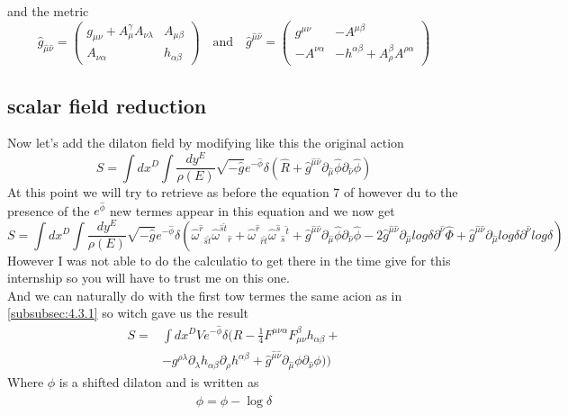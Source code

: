\documentclass{article}
\begin{document}
and the metric 
\begin{equation}
    \hat g_{\hat \mu \hat \nu} = \begin{pmatrix}
        g_{\mu \nu} + A^{\gamma}_{\mu}A_{\nu \lambda} &  A_{\mu \beta} \\  A_{\nu \alpha} &h_{\alpha \beta}
    \end{pmatrix} \quad \text{and} \quad \hat g^{\hat \mu \hat \nu} = \begin{pmatrix}
        g^{\mu \nu}  & - A^{\mu \beta} \\ - A^{\nu \alpha} &-h^{\alpha \beta}+ A^{\beta}_{\rho}A^{\rho \alpha}
    \end{pmatrix}
\end{equation}
\subsection{scalar field reduction}
Now let's add the dilaton field by modifying like this the original action
\begin{equation} 
    S =\int d x^D \int \frac{d y ^E}{\rho(E)} \sqrt{- \hat g} e^{- \hat \phi}\delta(\hat R  + \hat g^{\hat \mu  \hat \nu } \partial_{\hat \mu}\hat\phi\partial_{\hat \nu}\hat\phi)
\end{equation}
At this point we will try to retrieve as before the equation 7 of \cite{scherk1979get} however du to the presence of the $e^{\hat \phi}$ new termes appear in this equation and we now get
\begin{equation}
    S =\int d x^D \int \frac{d y ^E}{\rho(E)} \sqrt{- \hat g} e^{- \hat \phi}\delta( \hat \omega^{\hat r}{}_{\hat s \hat t} \hat \omega^{\hat s \hat t}{}_{\hat r} + \hat \omega^{\hat r}{}_{ \hat r \hat t}\hat \omega^{\hat s }{}_{\hat s}{}^{\hat t}+\hat g^{\hat \mu  \hat \nu } \partial_{\hat \mu}\hat\phi\partial_{\hat \nu}\hat\phi - 2 \hat g^{\hat \mu \hat \nu} \partial_{\hat \mu}log\delta\partial^{\hat \nu}\hat \Phi +\hat g^{\hat \mu \hat \nu}\partial_{\hat \mu}log\delta\partial^{\hat \nu} log\delta )
\end{equation}
However I was not able to do the calculatio  to get there in the time give for this internship so you will have to trust me on this one.\\
And we can naturally do with the first tow termes the same acion as in \ref{subsubsec:4.3.1} so witch gave us the result
\begin{equation}
    \begin{aligned}
    S = &\int d x^D V e^{- \hat \phi} \delta(
    R -\frac{1}{4}F^{\mu \nu \alpha}F^{\beta}_{\mu  \nu}h_{\alpha \beta}+\\
    &- g^{\rho \lambda} \partial_\lambda h_{\alpha \beta}\partial_\rho h^{\alpha \beta}
    +\hat g^{\hat \mu  \hat \nu } \partial_{\hat \mu}\phi\partial_{\hat \nu}\phi)
    )
\end{aligned}
\end{equation}
Where $\phi$ is a shifted dilaton and is written as 
\begin{equation}
    \phi = \hat \phi - \log{\delta}
\end{equation}
\end{document}
